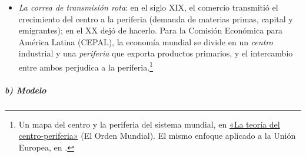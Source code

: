 \documentclass[11pt]{article}
\begin{document}
\begin{itemize}
\item \emph{La correa de transmisión rota}: en el siglo XIX, el comercio transmitió el crecimiento del centro a la periferia (demanda de materias primas, capital y emigrantes); en el XX dejó de hacerlo. Para la Comisión Económica para América Latina (CEPAL), la economía mundial se divide en un \emph{centro} industrial y una \emph{periferia} que exporta productos primarios, y el intercambio entre ambos perjudica a la periferia\nocite{Prebisch1949,Singer1950}.\footnote{Un mapa del centro y la periferia del sistema mundial, en \href{https://elordenmundial.com/mapas-y-graficos/la-teoria-del-centro-periferia/}{«La teoría del centro-periferia»} (El Orden Mundial). El mismo enfoque aplicado a la Unión Europea, en \textcite{DelRio2018CentroPeriferia}.}
\end{itemize}

\subparagraph{b) Modelo}
\end{document}
